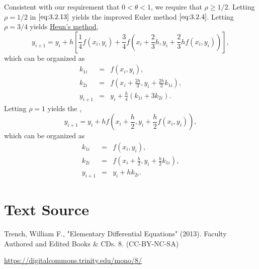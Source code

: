 \documentclass{ximera}
\begin{document}
Consistent with our requirement that $0<\theta<1$, we require that
$\rho\geq 1/2$. Letting $\rho=1/2$ in $\eqref{eq:3.2.13}$ yields the improved
Euler method $\eqref{eq:3.2.4}$. Letting $\rho=3/4$ yields
\href{https://en.wikipedia.org/wiki/Heun%27s_method}{Heun's method},
$$
y_{i+1}=y_i+h\left[\frac{1}{4}f(x_i,y_i)+\frac{3}{4}f\left(
x_i+\frac{2}{3}h,y_i+\frac{2}{3}hf(x_i,y_i)\right)\right],
$$
which can be organized as
\begin{eqnarray*}
k_{1i}&=&f(x_i,y_i),\\
k_{2i}&=&f\left(x_i+\frac{2h}{3},
y_i+\frac{2h}{3}k_{1i}\right),\\
y_{i+1}&=&y_i+\frac{h}{4}(k_{1i}+3k_{2i}).
\end{eqnarray*}
Letting $\rho=1$ yields the ,
$$
y_{i+1}=y_i+hf\left(x_i+\frac{h}{2},y_i+\frac{h}{2}f(x_i,y_i)\right),
$$
which can be organized as
\begin{eqnarray*}
k_{1i}&=&f(x_i,y_i),\\
k_{2i}&=&f\left(x_i+\frac{h}{2},
y_i+\frac{h}{2}k_{1i}\right),\\
y_{i+1}&=&y_i+hk_{2i}.
\end{eqnarray*}




\section*{Text Source}
Trench, William F., "Elementary Differential Equations" (2013). Faculty Authored and Edited Books \& CDs. 8. (CC-BY-NC-SA)

\href{https://digitalcommons.trinity.edu/mono/8/}{https://digitalcommons.trinity.edu/mono/8/}
\end{document}
